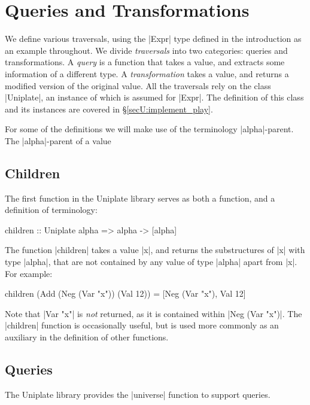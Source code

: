 \section{Queries and Transformations}
\label{secU:use_play}

We define various traversals, using the |Expr| type defined in the introduction as an example throughout. We divide \textit{traversals} into two categories: queries and transformations. A \textit{query} is a function that takes a value, and extracts some information of a different type. A \textit{transformation} takes a value, and returns a modified version of the original value. All the traversals rely on the class |Uniplate|, an instance of which is assumed for |Expr|. The definition of this class and its instances are covered in \S\ref{secU:implement_play}.

For some of the definitions we will make use of the terminology |alpha|-parent. The |alpha|-parent of a value

\subsection{Children}

The first function in the Uniplate library serves as both a function, and a definition of terminology:

\begin{code}
children :: Uniplate alpha => alpha -> [alpha]
\end{code}

The function |children| takes a value |x|, and returns the substructures of |x| with type |alpha|, that are not contained by any value of type |alpha| apart from |x|. For example:

\begin{code}
children (Add (Neg (Var "x")) (Val 12)) = [Neg (Var "x"), Val 12]
\end{code}

Note that |Var "x"| is \textit{not} returned, as it is contained within |Neg (Var "x")|. The |children| function is occasionally useful, but is used more commonly as an auxiliary in the definition of other functions.


\subsection{Queries}

The Uniplate library provides the |universe| function to support queries.

